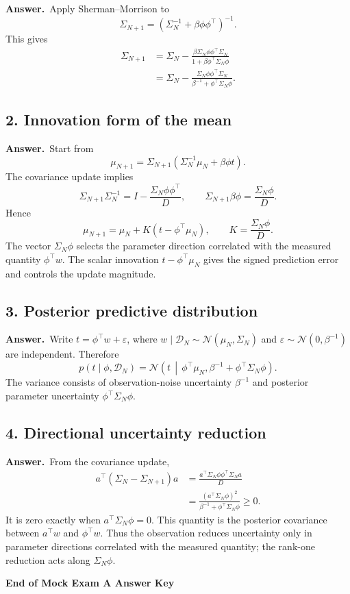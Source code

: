 \documentclass[11pt,a4paper]{article}
\newcommand{\answer}{\textbf{Answer.}\ }
\begin{document}
\answer Apply Sherman--Morrison to
\[
  \Sigma_{N+1}=(\Sigma_N^{-1}+\beta\phi\phi^\top)^{-1}.
\]
This gives
\begin{align*}
  \Sigma_{N+1}
  &=\Sigma_N-
  \frac{\beta\Sigma_N\phi\phi^\top\Sigma_N}
  {1+\beta\phi^\top\Sigma_N\phi}\\
  &=\boxed{\Sigma_N-
  \frac{\Sigma_N\phi\phi^\top\Sigma_N}
  {\beta^{-1}+\phi^\top\Sigma_N\phi}}.
\end{align*}

\subsection*{2. Innovation form of the mean}

\answer Start from
\[
  \mu_{N+1}=\Sigma_{N+1}
  (\Sigma_N^{-1}\mu_N+\beta\phi t).
\]
The covariance update implies
\[
  \Sigma_{N+1}\Sigma_N^{-1}
  =I-\frac{\Sigma_N\phi\phi^\top}{D},
  \qquad
  \Sigma_{N+1}\beta\phi=\frac{\Sigma_N\phi}{D}.
\]
Hence
\[
  \boxed{\mu_{N+1}=\mu_N+K(t-\phi^\top\mu_N)},
  \qquad
  \boxed{K=\frac{\Sigma_N\phi}{D}}.
\]
The vector $\Sigma_N\phi$ selects the parameter direction correlated with the measured quantity $\phi^\top w$. The scalar innovation $t-\phi^\top\mu_N$ gives the signed prediction error and controls the update magnitude.

\subsection*{3. Posterior predictive distribution}

\answer Write $t=\phi^\top w+\varepsilon$, where $w\mid\mathcal D_N\sim\mathcal N(\mu_N,\Sigma_N)$ and $\varepsilon\sim\mathcal N(0,\beta^{-1})$ are independent. Therefore
\[
  \boxed{p(t\mid\phi,\mathcal D_N)
  =\mathcal N\left(t\,\middle|\,
  \phi^\top\mu_N,
  \beta^{-1}+\phi^\top\Sigma_N\phi\right)}.
\]
The variance consists of observation-noise uncertainty $\beta^{-1}$ and posterior parameter uncertainty $\phi^\top\Sigma_N\phi$.

\subsection*{4. Directional uncertainty reduction}

\answer From the covariance update,
\begin{align*}
  a^\top(\Sigma_N-\Sigma_{N+1})a
  &=\frac{a^\top\Sigma_N\phi\phi^\top\Sigma_Na}{D}\\
  &=\boxed{\frac{(a^\top\Sigma_N\phi)^2}
  {\beta^{-1}+\phi^\top\Sigma_N\phi}}\geq 0.
\end{align*}
It is zero exactly when $a^\top\Sigma_N\phi=0$. This quantity is the posterior covariance between $a^\top w$ and $\phi^\top w$. Thus the observation reduces uncertainty only in parameter directions correlated with the measured quantity; the rank-one reduction acts along $\Sigma_N\phi$.

\vfill
\begin{center}
  \textbf{End of Mock Exam A Answer Key}
\end{center}
\end{document}
